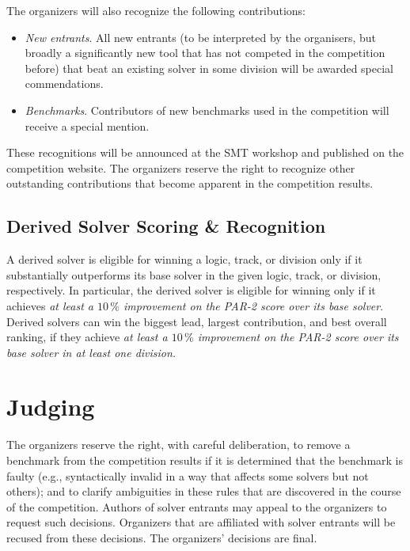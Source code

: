 \documentclass[12pt]{article}
\begin{document}
The organizers will also recognize the following contributions:
%
\begin{itemize}
\item \emph{New entrants}. All new entrants (to be interpreted by the organisers, but broadly a significantly new tool that has not competed in the competition before) that beat an existing solver in some division will be awarded special commendations.
\item \emph{Benchmarks}. Contributors of new benchmarks used in the competition will receive a special mention.
\end{itemize}
%
These recognitions will be announced at the SMT workshop and published on the competition website.
The organizers reserve the right to recognize other outstanding
contributions that become apparent in the competition results.

\subsection{Derived Solver Scoring \& Recognition}
A derived solver is eligible for winning a logic, track, or division only if it
substantially outperforms its base solver in the given logic, track, or
division, respectively. In particular, the derived solver is eligible for
winning only if it achieves \emph{at least a $10\,\%$ improvement on the PAR-2
 score over its base solver}. Derived solvers can win the biggest lead, largest
 contribution, and best overall ranking, if they achieve \emph{at least a $10\,\%$
 improvement on the PAR-2 score over its base solver in at least one division.}


\section{Judging}

The organizers reserve the right, with careful deliberation, to remove
a benchmark from the competition results if it is determined that the
benchmark is faulty (e.g., syntactically invalid in a way that affects
some solvers but not others); and to clarify ambiguities in these
rules that are discovered in the course of the competition.  Authors
of solver entrants may appeal to the organizers to request such
decisions.  Organizers that are affiliated with solver entrants will
be recused from these decisions.  The organizers' decisions are final.
\end{document}
